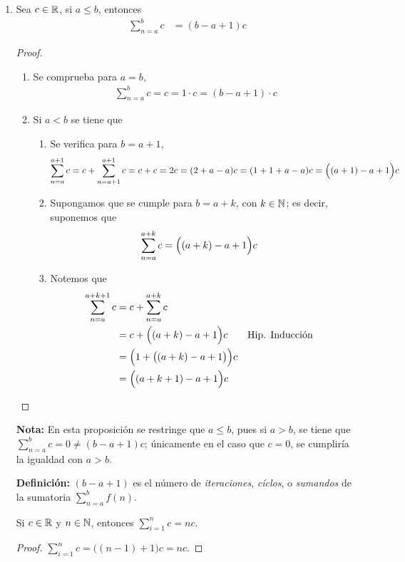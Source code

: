 \begin{enumerate}[label=\alph*)]
  \item Sea $c\in \mathbb{R}$, si $a\leq b$, entonces \begin{align*}
    \sum_{n=a}^b c &= (b-a+1)c
  \end{align*}
  \begin{proof}\leavevmode
    \begin{enumerate}[label=\Roman*)]
      \item Se comprueba para $a=b$, \begin{align*}
        \sum_{n=a}^b c = c = 1\cdot c = (b-a+1)\cdot c
      \end{align*}
      \item Si $a<b$ se tiene que \begin{enumerate}[label=\roman*)]
        \item Se verifica para $b=a+1$, \begin{align*}
          \sum_{n=a}^{a+1} c &= c + \sum_{n=a+1}^{a+1} c = c + c = 2c = (2+a-a)c = (1+1+a-a)c = \Bigl((a+1)-a+1\Bigr) c
        \end{align*}
        \item Supongamos que se cumple para $b=a+k$, con $k\in \mathbb{N}$; es decir, suponemos que \begin{align*}
          \sum_{n=a}^{a+k} c &= \Bigl((a+k)-a+1\Bigr) c
        \end{align*}
        \item Notemos que \begin{align*}
          \sum_{n=a}^{a+k+1} c &= c + \sum_{n=a}^{a+k} c\\
          &= c + \Bigl((a+k)-a+1\Bigr) c && \text{Hip. Inducción}\\
          &= \Bigl(1 + \bigl((a+k)-a+1\bigr) \Bigr)c\\
          &= \Bigl((a+k+1)-a+1\Bigr)c
        \end{align*}
      \end{enumerate}
    \end{enumerate}
  \end{proof}

  \textbf{Nota:} En esta proposición se restringe que $a\leq b$, pues si $a>b$, se tiene que $\sum_{n=a}^{b} c = 0 \neq (b-a+1)c$; únicamente en el caso que $c=0$, se cumpliría la igualdad con $a>b$.

  \textbf{Definición:} $(b-a+1)$ es el número de \textit{iteraciones}, \textit{cíclos}, o \textit{sumandos} de la sumatoria $\sum_{n=a}^{b} f(n)$.

   Si $c\in \mathbb{R}$ y $n\in \mathbb{N}$, entonces $\sum_{i=1}^n c = nc$.
  \begin{proof} $\sum_{i=1}^n c = \bigl((n-1)+1\bigr) c = nc$.
  \end{proof}
  

\end{enumerate}
